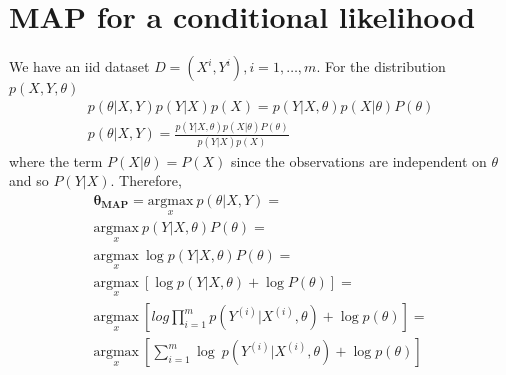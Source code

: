 \documentclass[12pt]{article}
\begin{document}
\section{MAP for a conditional likelihood}

We have an iid dataset $D = {(X^i,Y^i),i = 1,\dots, m}$. For the distribution $p(X,Y,\theta)$
\begin{equation}
\begin{array}{l}
p(\theta|X,Y)p(Y|X)p(X) = p(Y|X,\theta)p(X|\theta)P(\theta) \\
p(\theta | X,Y) = \frac{p(Y|X,\theta)p(X|\theta)P(\theta)}{p(Y|X)p(X)}
\end{array}
\end{equation}	
where the term $P(X|\theta) = P(X)$ since the observations are independent on $\theta$ and so $P(Y|X)$. Therefore,
\begin{equation}
\begin{array}{l}
\mathbf{\theta_{MAP}} = 
\underset{x}{\mathrm{argmax}}~p(\theta|X,Y) = \\
\underset{x}{\mathrm{argmax}}~p(Y|X,\theta)P(\theta) = \\
\underset{x}{\mathrm{argmax}}~\log p(Y|X,\theta)P(\theta) = \\
\underset{x}{\mathrm{argmax}}~[\log p(Y|X,\theta) + \log P(\theta)] = \\
\underset{x}{\mathrm{argmax}}~[log \prod_{i=1}^{m}p(Y^{(i)} | X^{(i)},\theta) + \log p(\theta)] = \\
\underset{x}{\mathrm{argmax}}~[\sum_{i=1}^{m}\log~p(Y^{(i)} | X^{(i)}, \theta) + \log p(\theta)] 
\end{array}
\end{equation}
\end{document}
